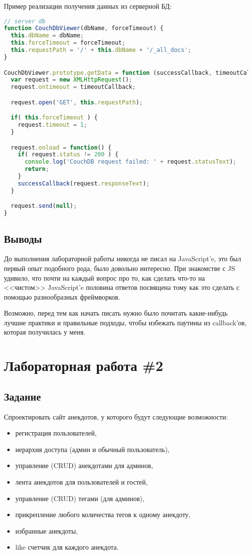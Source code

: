 \documentclass[14pt, a4paper]{extreport}
\begin{document}
Пример реализации получения данных из серверной БД:
\begin{lstlisting}[language=JavaScript]
// server db
function CouchDbViewer(dbName, forceTimeout) {
  this.dbName = dbName;
  this.forceTimeout = forceTimeout;
  this.requestPath = '/' + this.dbName + '/_all_docs';
}

CouchDbViewer.prototype.getData = function (successCallback, timeoutCallback) {
  var request = new XMLHttpRequest();
  request.ontimeout = timeoutCallback;

  request.open('GET', this.requestPath);

  if( this.forceTimeout ) {
    request.timeout = 1;
  }

  request.onload = function() {
    if( request.status != 200 ) {
      console.log('CouchDB request failed: ' + request.statusText);
      return;
    }
    successCallback(request.responseText);
  }

  request.send(null);
}
\end{lstlisting}


\subsection*{Выводы}
До выполнения лабораторной работы никогда не писал на JavaScript'e,
это был первый опыт подобного рода, было довольно интересно.
При знакомстве с JS удивило, что почти на каждый вопрос про то,
как сделать что-то на <<чистом>> JavaScript'e половина ответов посвящена
тому как это сделать с помощью разнообразных фреймворков.

Возможно, перед тем как начать писать нужно было почитать какие-нибудь лучшие практики
и правильные подходы, чтобы избежать паутины из callback'ов, которая получилась у меня.

\section*{Лабораторная работа \#2}
\subsection*{Задание}
Спроектировать сайт анекдотов, у которого будут следующие возможности:
\begin{itemize}
\item регистрация пользователей,
\item иерархия доступа (админ и обычный пользователь),
\item управление (CRUD) анекдотами для админов,
\item лента анекдотов для пользователей и гостей,
\item управление (CRUD) тегами (для админов),
\item прикрепление любого количества тегов к одному анекдоту,
\item избранные анекдоты,
\item like счетчик для каждого анекдота.

\end{itemize}
\end{document}
